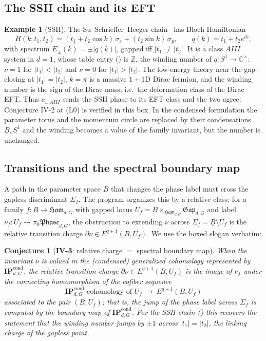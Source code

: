 \documentclass[12pt]{article}
\newcommand{\cond}[1]{\underline{#1}}          %
\newcommand{\Ham}{\mathfrak{Ham}}              %
\newcommand{\Gap}{\mathfrak{Gap}}              %
\newcommand{\Phase}{\mathfrak{Phase}}          %
\newcommand{\IPcond}{\mathbf{IP}^{\mathrm{cond}}}  %
\newcommand{\Sig}{\Sigma}                       %
\newcommand{\rc}{\partial\nu}                   %
\newcommand{\Zp}{\mathbb{Z}}
\theoremstyle{definition}
\newtheorem{example}[example]{Example}
\theoremstyle{remark}
\theoremstyle{plain}
\newtheorem*{conjecture}{Conjecture}
\begin{document}
\subsection{The SSH chain and its EFT}

\begin{example}[SSH]
\label{ex:ssh}
The Su--Schrieffer--Heeger chain~\cite{ssh-1979} has Bloch Hamiltonian
\[
  H(k;t_1,t_2)=(t_1+t_2\cos k)\,\sigma_x+(t_2\sin k)\,\sigma_y,
  \qquad q(k)=t_1+t_2 e^{ik},
\]
with spectrum $E_\pm(k)=\pm|q(k)|$, gapped iff $|t_1|\ne|t_2|$. It is a class
$\mathit{AIII}$ system in $d=1$, whose table entry () is $\Zp$,
the winding number of $q:S^1\to\mathbb C^\times$: $\nu=1$ for $|t_1|<|t_2|$ and
$\nu=0$ for $|t_1|>|t_2|$. The low-energy theory near the gap-closing at
$|t_1|=|t_2|$, $k=\pi$ is a massive $1{+}1$D Dirac fermion, and the winding number
is the sign of the Dirac mass, i.e.\ the deformation class of the Dirac EFT.
Thus $c_{1,\mathit{AIII}}$ sends the SSH phase to its EFT class and the two agree:
Conjecture IV-2 at (L0) is verified in this box. In the condensed formulation the
parameter torus and the momentum circle are replaced by their condensations
$\cond B,\cond{S^1}$ and the winding becomes a value of the family invariant, but
the number is unchanged.
\end{example}

\subsection{Transitions and the spectral boundary map}

A path in the parameter space $B$ that changes the phase label must cross the
gapless discriminant $\Sig_f$. The program organizes this by a relative class:
for a family $f:\cond B\to\Ham_{d,G}$ with gapped locus
$U_f=\cond B\times_{\Ham_{d,G}}\Gap_{d,G}$ and label $\nu_f:U_f\to\pi_0\Phase_{d,G}$,
the obstruction to extending $\nu$ across $\Sig_f=\cond B\setminus U_f$ is the
relative transition charge $\rc\in E^{q+1}(B,U_f)$. We use the boxed slogan
verbatim:
\begin{center}
\end{center}

\begin{conjecture}[\textbf{IV-3}: relative charge $=$ spectral boundary map]
\label{conj:iv3}
When the invariant $\nu$ is valued in the (condensed) generalized cohomology
represented by $\IPcond_{d,G}$, the relative transition charge $\rc\in
E^{q+1}(B,U_f)$ is the image of $\nu_f$ under the connecting homomorphism of
the cofiber sequence
\[
  \IPcond_{d,G}\text{-cohomology of }U_f
  \ \longrightarrow\
  E^{q+1}(B,U_f)
\]
associated to the pair $(B,U_f)$; that is, the jump of the phase label across
$\Sig_f$ is computed by the boundary map of $\IPcond_{d,G}$. For the SSH chain
(\Cref{ex:ssh}) this recovers the statement that the winding number jumps by
$\pm1$ across $|t_1|=|t_2|$, the linking charge of the gapless point.
\end{conjecture}
\end{document}
